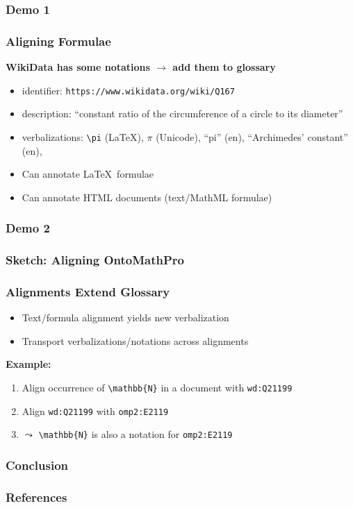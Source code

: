 \documentclass[aspectratio=169]{beamer}
\begin{document}
\begin{frame}
    \frametitle{Demo 1}
\end{frame}

\begin{frame}[fragile]
    \frametitle{Aligning Formulae}
    \textbf{WikiData has some notations $\to$ add them to glossary}
    \vspace{1em}\par
    \begin{itemize}
        \item identifier: \texttt{https://www.wikidata.org/wiki/Q167}
        \item description: ``constant ratio of the circumference of a circle to its diameter''
        \item verbalizations: \verb.\pi. (\LaTeX), $\pi$ (Unicode), ``pi'' (en), ``Archimedes' constant'' (en), \textellipsis
    \end{itemize}
    \vspace{1em}\par
    \pause
    \begin{itemize}
        \item Can annotate \LaTeX\ formulae
        \item Can annotate HTML documents (text/MathML formulae)
    \end{itemize}
\end{frame}

\begin{frame}
    \frametitle{Demo 2}
\end{frame}

\begin{frame}
    \frametitle{Sketch: Aligning OntoMathPro}
\end{frame}

\begin{frame}[fragile]
    \frametitle{Alignments Extend Glossary}
    \begin{itemize}
        \item Text/formula alignment yields new verbalization
        \item Transport verbalizations/notations across alignments
    \end{itemize}
    \vspace{1em}\par
    \textbf{Example:}\\
    \begin{enumerate}
        \item Align occurrence of \verb|\mathbb{N}| in a document with \texttt{wd:Q21199}
        \item Align \texttt{wd:Q21199} with \texttt{omp2:E2119}
        \item $\leadsto$ \verb|\mathbb{N}| is also a notation for \texttt{omp2:E2119}
    \end{enumerate}
\end{frame}

\begin{frame}
    \frametitle{Conclusion}
\end{frame}

\appendix
\begin{frame}[allowframebreaks,t]
    \frametitle{References}
    \printbibliography
\end{frame}
\end{document}
